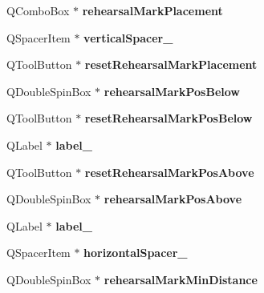 \begin{DoxyCompactItemize}
Q\+Combo\+Box $\ast$ {\bfseries rehearsal\+Mark\+Placement}
\item 
\mbox{\label{class_ui___edit_style_base_aa10bf9937b4f227c119895fc0bdbba97}} 
Q\+Spacer\+Item $\ast$ {\bfseries vertical\+Spacer\+\_}
\item 
\mbox{\label{class_ui___edit_style_base_a7cbad7ca39f38e0ec37220875480a4e8}} 
Q\+Tool\+Button $\ast$ {\bfseries reset\+Rehearsal\+Mark\+Placement}
\item 
\mbox{\label{class_ui___edit_style_base_a47748f15af375e7dba342c95e23db095}} 
Q\+Double\+Spin\+Box $\ast$ {\bfseries rehearsal\+Mark\+Pos\+Below}
\item 
\mbox{\label{class_ui___edit_style_base_a39e51d6e6f9825bba005a91c4aa0791c}} 
Q\+Tool\+Button $\ast$ {\bfseries reset\+Rehearsal\+Mark\+Pos\+Below}
\item 
\mbox{\label{class_ui___edit_style_base_afe16c1e7d6ddc6d9da4f7b800421b0e8}} 
Q\+Label $\ast$ {\bfseries label\+\_}
\item 
\mbox{\label{class_ui___edit_style_base_a59b18837c0bf70e51baab7a649f509ba}} 
Q\+Tool\+Button $\ast$ {\bfseries reset\+Rehearsal\+Mark\+Pos\+Above}
\item 
\mbox{\label{class_ui___edit_style_base_af79d59070fc00fdc54040efb738d06db}} 
Q\+Double\+Spin\+Box $\ast$ {\bfseries rehearsal\+Mark\+Pos\+Above}
\item 
\mbox{\label{class_ui___edit_style_base_a5602b2c44c3d24ee8e40193813ae1e24}} 
Q\+Label $\ast$ {\bfseries label\+\_}
\item 
\mbox{\label{class_ui___edit_style_base_adad931d9427ed7ae938092106ba27a42}} 
Q\+Spacer\+Item $\ast$ {\bfseries horizontal\+Spacer\+\_}
\item 
\mbox{\label{class_ui___edit_style_base_a897598853f27b243366e449b32746fba}} 
Q\+Double\+Spin\+Box $\ast$ {\bfseries rehearsal\+Mark\+Min\+Distance}

\end{DoxyCompactItemize}
